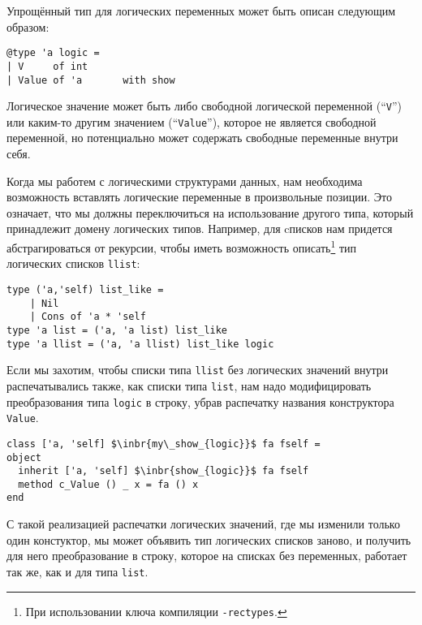 Упрощённый тип для логических переменных может быть описан следующим образом:

\begin{lstlisting}
@type 'a logic =
| V     of int
| Value of 'a       with show
\end{lstlisting}
Логическое значение может быть либо свободной логической переменной (``\lstinline{V}'') или каким-то другим значением (``\lstinline{Value}''), которое не является свободной переменной, но потенциально может содержать свободные переменные внутри себя. 
\begin{comment}

Чтобы преобразовывать в и из логических значений, можно воспользоваться следующими функциями:

\begin{lstlisting}
let lift x = Value x

let reify  = function
| V     _ -> invalid_arg "Free variable"
| Value x -> x
\end{lstlisting}

Функция ``\lstinline{reify}'' бросает исключение для свободных переменных, так как в присутствии вхождений свободных переменных
логическое значение нельзя рассматривать как обыкновенную (нелогическую) структуру данных.
\end{comment}


Когда мы работем с логическими структурами данных, нам необходима возможность вставлять логические переменные в произвольные позиции.
Это означает, что мы должны переключиться на использование другого типа, который принадлежит домену логических типов. Например,
для cписков нам придется абстрагироваться от рекурсии, чтобы иметь возможность описать\footnote{При использовании ключа компиляции \texttt{-rectypes}.} тип логических списков \lstinline{llist}:

\begin{lstlisting}
type ('a,'self) list_like = 
    | Nil 
    | Cons of 'a * 'self
type 'a list = ('a, 'a list) list_like
type 'a llist = ('a, 'a llist) list_like logic
\end{lstlisting}
%

Если мы захотим, чтобы списки типа \lstinline{llist} без логических значений внутри распечатывались также, как списки типа \lstinline{list}, нам надо модифицировать преобразования типа \lstinline{logic} в строку, убрав распечатку названия конструктора \lstinline{Value}.
\begin{lstlisting}
class ['a, 'self] $\inbr{my\_show_{logic}}$ fa fself = 
object
  inherit ['a, 'self] $\inbr{show_{logic}}$ fa fself
  method c_Value () _ x = fa () x
end
\end{lstlisting}
С такой реализацией распечатки логических значений, где мы изменили только один констуктор, мы может объявить тип логических списков заново, и получить для него преобразование в строку, которое на списках без переменных, работает так же, как и для типа \lstinline|list|. 

